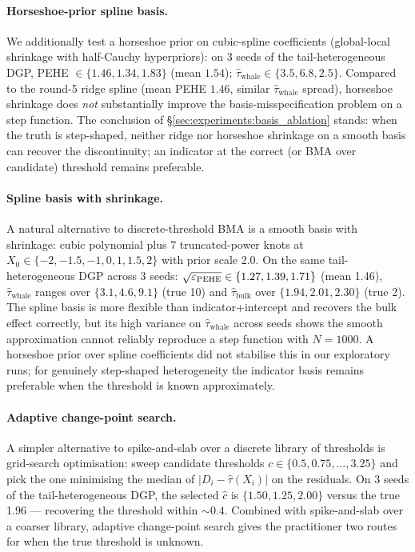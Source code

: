 \paragraph{Horseshoe-prior spline basis.}
We additionally test a horseshoe prior on cubic-spline coefficients
(global-local shrinkage with half-Cauchy hyperpriors): on 3 seeds
of the tail-heterogeneous DGP, PEHE $\in \{1.46, 1.34, 1.83\}$ (mean
$1.54$); $\hat\tau_{\text{whale}} \in \{3.5, 6.8, 2.5\}$. Compared
to the round-5 ridge spline (mean PEHE $1.46$, similar
$\hat\tau_{\text{whale}}$ spread), horseshoe shrinkage does
\emph{not} substantially improve the basis-misspecification problem
on a step function. The conclusion of \S\ref{sec:experiments:basis_ablation}
stands: when the truth is step-shaped, neither ridge nor horseshoe
shrinkage on a smooth basis can recover the discontinuity; an
indicator at the correct (or BMA over candidate) threshold
remains preferable.

\paragraph{Spline basis with shrinkage.}
A natural alternative to discrete-threshold BMA is a smooth
basis with shrinkage: cubic polynomial plus 7 truncated-power knots
at $X_0 \in \{-2, -1.5, -1, 0, 1, 1.5, 2\}$ with prior scale 2.0.
On the same tail-heterogeneous DGP across 3 seeds:
$\sqrt{\varepsilon_{\mathrm{PEHE}}} \in \{1.27, 1.39, 1.71\}$ (mean 1.46), $\hat\tau_{\text{whale}}$
ranges over $\{3.1, 4.6, 9.1\}$ (true 10) and $\hat\tau_{\text{bulk}}$
over $\{1.94, 2.01, 2.30\}$ (true 2). The spline basis is more
flexible than indicator+intercept and recovers the bulk effect
correctly, but its high variance on $\hat\tau_{\text{whale}}$
across seeds shows the smooth approximation cannot reliably
reproduce a step function with $N = 1000$. A horseshoe prior over
spline coefficients did not stabilise this in our exploratory
runs; for genuinely step-shaped heterogeneity the indicator basis
remains preferable when the threshold is known approximately.

\paragraph{Adaptive change-point search.}
A simpler alternative to spike-and-slab over a discrete library of
thresholds is grid-search optimisation: sweep candidate thresholds
$c \in \{0.5, 0.75, \dots, 3.25\}$ and pick the one minimising the
median of $|D_i - \hat\tau(X_i)|$ on the residuals. On 3 seeds of
the tail-heterogeneous DGP, the selected $\hat c$ is $\{1.50, 1.25,
2.00\}$ versus the true 1.96 --- recovering the threshold within
$\sim 0.4$. Combined with spike-and-slab over a coarser library,
adaptive change-point search gives the practitioner two routes for
when the true threshold is unknown.

